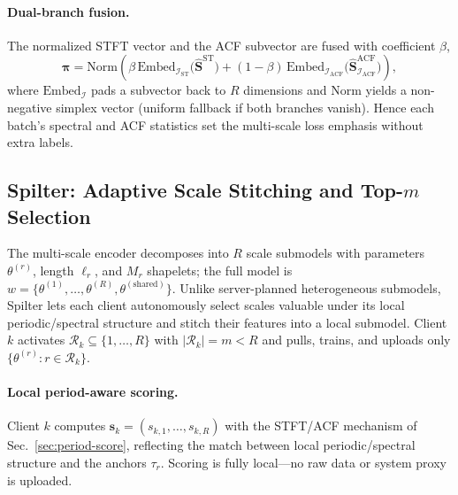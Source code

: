 \documentclass[sigconf]{acmart}
\begin{document}
\paragraph{Dual-branch fusion.}
The normalized STFT vector and the ACF subvector are fused with coefficient
$\beta$,
\begin{equation}
\boldsymbol{\pi}=\mathrm{Norm}\!\left(
\beta\,\mathrm{Embed}_{\mathcal{I}_{\mathrm{ST}}}\!\bigl(\hat{\mathbf{S}}^{\mathrm{ST}}\bigr)
+(1-\beta)\,\mathrm{Embed}_{\mathcal{I}_{\mathrm{ACF}}}\!\bigl(\hat{\mathbf{S}}^{\mathrm{ACF}}_{\mathcal{I}_{\mathrm{ACF}}}\bigr)
\right),
\label{eq:period-fuse}
\end{equation}
where $\mathrm{Embed}_{\mathcal{I}}$ pads a subvector back to $R$ dimensions and
$\mathrm{Norm}$ yields a non-negative simplex vector (uniform fallback if both
branches vanish). Hence each batch's spectral and ACF statistics set the
multi-scale loss emphasis without extra labels.

\subsection{Spilter: Adaptive Scale Stitching and Top-$m$ Selection}
\label{sec:spilter}

The multi-scale encoder decomposes into $R$ scale submodels with parameters
$\theta^{(r)}$, length $\ell_r$, and $M_r$ shapelets; the full model is
$w=\{\theta^{(1)},\dots,\theta^{(R)},\theta^{(\mathrm{shared})}\}$. Unlike
server-planned heterogeneous submodels, Spilter lets each client autonomously
select scales valuable under its local periodic/spectral structure and stitch
their features into a local submodel. Client $k$ activates
$\mathcal{R}_k\subseteq\{1,\dots,R\}$ with $|\mathcal{R}_k|=m<R$ and pulls,
trains, and uploads only $\{\theta^{(r)}:r\in\mathcal{R}_k\}$.

\paragraph{Local period-aware scoring.}
Client $k$ computes $\mathbf{s}_k=(s_{k,1},\dots,s_{k,R})$ with the STFT/ACF
mechanism of Sec.~\ref{sec:period-score}, reflecting the match between local
periodic/spectral structure and the anchors $\tau_r$. Scoring is fully
local---no raw data or system proxy is uploaded.
\end{document}
